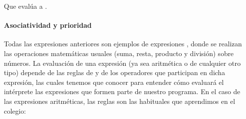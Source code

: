 \documentclass[a4paper,12pt,spanish]{sphinxmanual}
\begin{document}
\begin{sphinxVerbatim}[commandchars=\\\{\}]
    
\end{sphinxVerbatim}

Que evalúa a .


\paragraph{Asociatividad y prioridad}
\label{\detokenize{php:asociatividad-y-prioridad}}
\ignorespaces 
Todas las expresiones anteriores son ejemplos de expresiones ,
donde se realizan las operaciones matemáticas usuales (suma, resta, producto y
división) sobre números. La evaluación de una expresión (ya sea aritmética o de
cualquier otro tipo) depende de las reglas de  y 
de los operadores que participan en dicha expresión, las cuales tenemos que
conocer para entender cómo evaluará el intérprete las expresiones que formen
parte de nuestro programa. En el caso de las expresiones aritméticas, las
reglas son las habituales que aprendimos en el colegio:
\end{document}
